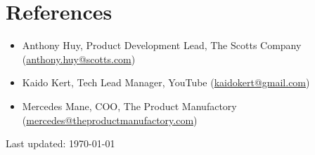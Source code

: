 \documentclass[letterpaper]{article}
\def\footerlink{}
\begin{document}
\section*{References}

\begin{itemize}
  \item Anthony Huy, Product Development Lead, The Scotts Company (\href{mailto:anthony.huy@scotts.com}{anthony.huy@scotts.com})
  \item Kaido Kert, Tech Lead Manager, YouTube (\href{mailto:kaidokert@gmail.com}{kaidokert@gmail.com})
  \item Mercedes Mane, COO, The Product Manufactory (\href{mailto:mercedes@theproductmanufactory.com}{mercedes@theproductmanufactory.com})
\end{itemize}

\bigskip

\begin{center}
  \begin{footnotesize}
    Last updated: \today \\
    \href{\footerlink}{\texttt{\footerlink}}
  \end{footnotesize}
\end{center}
\end{document}
